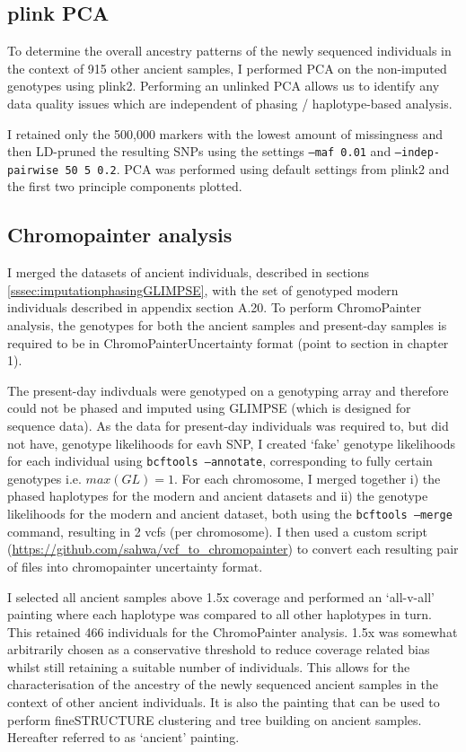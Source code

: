 \subsection{plink PCA}

To determine the overall ancestry patterns of the newly sequenced individuals in the context of 915 other ancient samples, I performed PCA on the non-imputed genotypes using plink2. Performing an unlinked PCA allows us to identify any data quality issues which are independent of phasing / haplotype-based analysis. 

I retained only the 500,000 markers with the lowest amount of missingness and then LD-pruned the resulting SNPs using the settings \texttt{--maf 0.01} and \texttt{--indep-pairwise 50 5 0.2}. PCA was performed using default settings from plink2 and the first two principle components plotted.

\subsection{Chromopainter analysis}

I merged the datasets of ancient individuals, described in sections \ref{sssec:imputationphasingGLIMPSE}, with the set of genotyped modern individuals described in appendix section A.20. To perform ChromoPainter analysis, the genotypes for both the ancient samples and present-day samples is required to be in ChromoPainterUncertainty format (point to section in chapter 1). 

The present-day indivduals were genotyped on a genotyping array and therefore could not be phased and imputed using GLIMPSE (which is designed for sequence data). As the data for present-day individuals was required to, but did not have, genotype likelihoods for eavh SNP, I created `fake' genotype likelihoods for each individual using \texttt{bcftools --annotate}, corresponding to fully certain genotypes i.e. $max(GL) = 1$. For each chromosome, I merged together i) the phased haplotypes for the modern and ancient datasets and ii) the genotype likelihoods for the modern and ancient dataset, both using the \texttt{bcftools --merge} command, resulting in 2 vcfs (per chromosome). I then used a custom script (\url{https://github.com/sahwa/vcf_to_chromopainter}) to convert each resulting pair of files into chromopainter uncertainty format. 

I selected all ancient samples above 1.5x coverage and performed an `all-v-all' painting where each haplotype was compared to all other haplotypes in turn. This retained 466 individuals for the ChromoPainter analysis. 1.5x was somewhat arbitrarily chosen as a conservative threshold to reduce coverage related bias whilst still retaining a suitable number of individuals. This allows for the characterisation of the ancestry of the newly sequenced ancient samples in the context of other ancient individuals. It is also the painting that can be used to perform fineSTRUCTURE clustering and tree building on ancient samples. Hereafter referred to as `ancient' painting.

